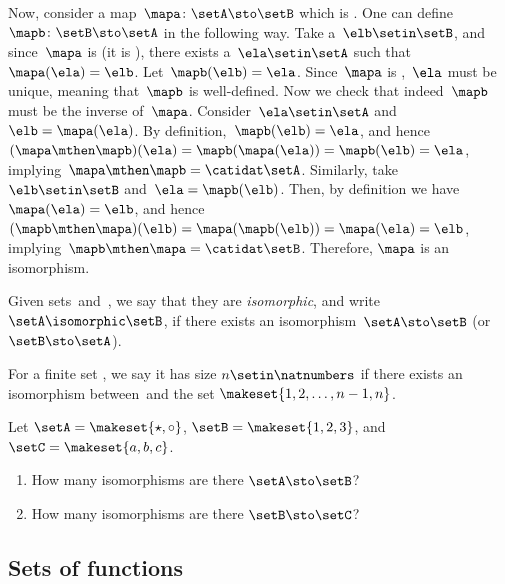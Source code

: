 \begin{solution}
    Now, consider a map~$\mapa\colon \setA \sto \setB$ which is .
    One can define~$\mapb\colon \setB \sto \setA$ in the following way.
    Take a~$\elb\setin\setB$, and since~$\mapa$ is  (it is ), there exists a~$\ela\setin\setA$ such that~$\mapa(\ela)=\elb$.
    Let~$\mapb(\elb)=\ela$.
    Since~$\mapa$ is ,~$\ela$ must be unique, meaning that~$\mapb$ is well-defined.
    Now we check that indeed~$\mapb$ must be the inverse of~$\mapa$.
    Consider~$\ela \setin\setA$ and~$\elb=\mapa(\ela)$.
    By definition,~$\mapb(\elb)=\ela$, and hence~$(\mapa\mthen \mapb)(\ela)=\mapb(\mapa(\ela))=\mapb(\elb)=\ela$, implying~$\mapa\mthen \mapb=\catidat\setA$.
    Similarly, take~$\elb\setin\setB$ and~$\ela=\mapb(\elb)$.
    Then, by definition we have~$\mapa(\ela)=\elb$, and hence~$(\mapb\mthen \mapa)(\elb)=\mapa(\mapb(\elb))=\mapa(\ela)=\elb$, implying~$\mapb\mthen \mapa=\catidat\setB$.
    Therefore, $\mapa$ is an isomorphism.
\end{solution}

\begin{ctdefinition}\label{def:set-isomorphic}
    Given sets~\setA and~\setB, we say that they are \emph{isomorphic}, and write~$\setA \isomorphic \setB$,
    if there exists an isomorphism~$\setA \sto \setB$ (or~$\setB \sto \setA$).
\end{ctdefinition}

For a finite set \setA, we say it has size $n \setin \natnumbers$ if there exists an isomorphism between~\setA and the set $\makeset{1,2, \dots, n-1, n}$.

\begin{gradedexercise}
    \label{ex:CountingIsos}

    Let $\setA = \makeset{{{\star}}, {{\circ}} }$, $\setB = \makeset{1, 2, 3}$, and $\setC = \makeset{a, b, c}$.
    \begin{enumerate}
        \item How many isomorphisms are there $\setA \sto \setB$?
        \item How many isomorphisms are there $\setB \sto \setC$?
    \end{enumerate}
\end{gradedexercise}


\subsection{Sets of functions}

